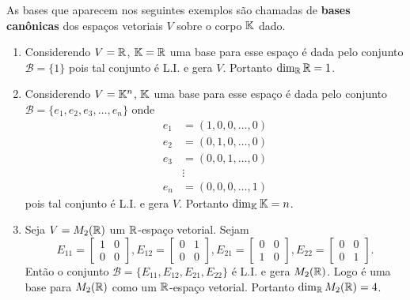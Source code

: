 As bases que aparecem nos seguintes exemplos são chamadas de \textbf{bases canônicas} dos espaços vetoriais $V$ sobre o corpo $\mathbb{K}$ dado.
\begin{exemplos}
	\begin{enumerate}
		\item Considerendo $V = \mathbb{R}$, $\mathbb{K} = \mathbb{R}$ uma base para esse espaço é dada pelo conjunto $\mathcal{B} = \{1\}$ pois tal conjunto é L.I. e gera $V$. Portanto $\dim_{\mathbb{R}}\mathbb{R} = 1$.

		\item Considerendo $V = \mathbb{K}^n$, $\mathbb{K}$ uma base para esse espaço é dada pelo conjunto $\mathcal{B} = \{e_1, e_2, e_3, \dots, e_n\}$ onde
			\begin{align*}
				e_1 &= (1, 0, 0, \dots, 0)\\
				e_2 &= (0, 1, 0, \dots, 0)\\
				e_3 &= (0, 0, 1, \dots, 0)\\
						&\vdots\\
				e_n &= (0, 0, 0, \dots, 1)
			\end{align*}
			pois tal conjunto é L.I. e gera $V$. Portanto $\dim_{\mathbb{K}}\mathbb{K} = n$.

		\item Seja $V = M_2(\mathbb{R})$ um $\mathbb{R}$-espaço vetorial. Sejam
			\[
				E_{11} = \begin{bmatrix}1 & 0\\0 & 0\end{bmatrix},
				E_{12} = \begin{bmatrix}0 & 1\\0 & 0\end{bmatrix},
				E_{21} = \begin{bmatrix}0 & 0\\1 & 0\end{bmatrix},
				E_{22} = \begin{bmatrix}0 & 0\\0 & 1\end{bmatrix}.
			\]
			Então o conjunto $\mathcal{B} = \{E_{11}, E_{12}, E_{21}, E_{22}\}$ é L.I. e gera $M_2(\mathbb{R})$. Logo é uma base para $M_2(\mathbb{R})$ como um $\mathbb{R}$-espaço vetorial. Portanto $\dim_{\mathbb{R}} M_2(\mathbb{R}) = 4$.


\end{enumerate}
\end{exemplos}
